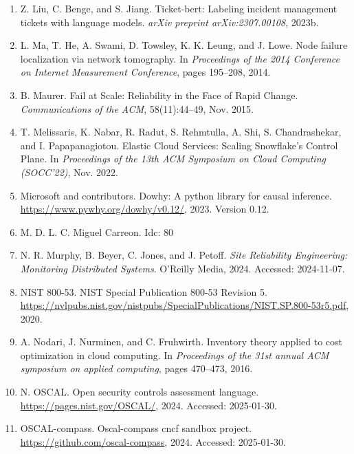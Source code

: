 \documentclass[10pt,UTF8,fontset=fandol]{ctexart}
\begin{document}
\begin{enumerate}[leftmargin=2em,itemsep=2pt]
\item Z. Liu, C. Benge, and S. Jiang. Ticket-bert: Labeling incident management tickets with language models. \textit{arXiv preprint arXiv:2307.00108}, 2023b.

\item L. Ma, T. He, A. Swami, D. Towsley, K. K. Leung, and J. Lowe. Node failure localization via network tomography. In \textit{Proceedings of the 2014 Conference on Internet Measurement Conference}, pages 195--208, 2014.

\item B. Maurer. Fail at Scale: Reliability in the Face of Rapid Change. \textit{Communications of the ACM}, 58(11):44--49, Nov. 2015.

\item T. Melissaris, K. Nabar, R. Radut, S. Rehmtulla, A. Shi, S. Chandrashekar, and I. Papapanagiotou. Elastic Cloud Services: Scaling Snowflake's Control Plane. In \textit{Proceedings of the 13th ACM Symposium on Cloud Computing (SOCC'22)}, Nov. 2022.

\item Microsoft and contributors. Dowhy: A python library for causal inference. \url{https://www.pywhy.org/dowhy/v0.12/}, 2023. Version 0.12.

\item M. D. L. C. Miguel Carreon. Idc: 80

\item N. R. Murphy, B. Beyer, C. Jones, and J. Petoff. \textit{Site Reliability Engineering: Monitoring Distributed Systems}. O'Reilly Media, 2024. Accessed: 2024-11-07.

\item NIST 800-53. NIST Special Publication 800-53 Revision 5. \url{https://nvlpubs.nist.gov/nistpubs/SpecialPublications/NIST.SP.800-53r5.pdf}, 2020.

\item A. Nodari, J. Nurminen, and C. Fruhwirth. Inventory theory applied to cost optimization in cloud computing. In \textit{Proceedings of the 31st annual ACM symposium on applied computing}, pages 470--473, 2016.

\item N. OSCAL. Open security controls assessment language. \url{https://pages.nist.gov/OSCAL/}, 2024. Accessed: 2025-01-30.

\item OSCAL-compass. Oscal-compass cncf sandbox project. \url{https://github.com/oscal-compass}, 2024. Accessed: 2025-01-30.


\end{enumerate}
\end{document}
